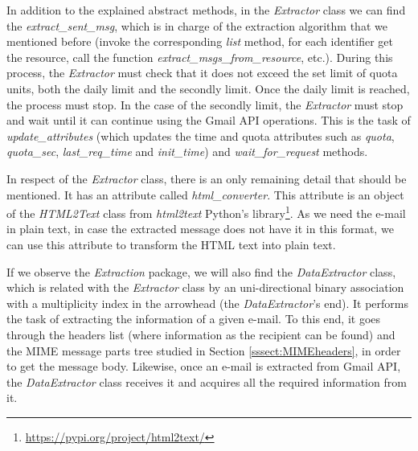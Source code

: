 In addition to the explained abstract methods, in the \textit{Extractor} class we can find the \textit{extract\_sent\_msg}, which is in charge of the extraction algorithm that we mentioned before (invoke the corresponding \textit{list} method, for each identifier get the resource, call the function \textit{extract\_msgs\_from\_resource}, etc.). During this process, the \textit{Extractor} must check that it does not exceed the set limit of quota units, both the daily limit and the secondly limit. Once the daily limit is reached, the process must stop. In the case of the secondly limit, the \textit{Extractor} must stop and wait until it can continue using the Gmail API operations. This is the task of \textit{update\_attributes} (which updates the time and quota attributes such as \textit{quota}, \textit{quota\_sec}, \textit{last\_req\_time} and \textit{init\_time}) and \textit{wait\_for\_request} methods.

In respect of the \textit{Extractor} class, there is an only remaining detail that should be mentioned. It has an attribute called \textit{html\_converter}. This attribute is an object of the \textit{HTML2Text} class from \textit{html2text} Python's library\footnote{\url{https://pypi.org/project/html2text/}}. As we need the e-mail in plain text, in case the extracted message does not have it in this format, we can use this attribute to transform the HTML text into plain text.

If we observe the \textit{Extraction} package, we will also find the \textit{DataExtractor} class, which is related with the \textit{Extractor} class by an uni-directional binary association with a multiplicity index in the arrowhead (the \textit{DataExtractor}'s end). It performs the task of extracting the information of a given e-mail. To this end, it goes through the headers list (where information as the recipient can be found) and the MIME message parts tree studied in Section \ref{sssect:MIMEheaders}, in order to get the message body. Likewise, once an e-mail is extracted from Gmail API, the \textit{DataExtractor} class receives it and acquires all the required information from it.